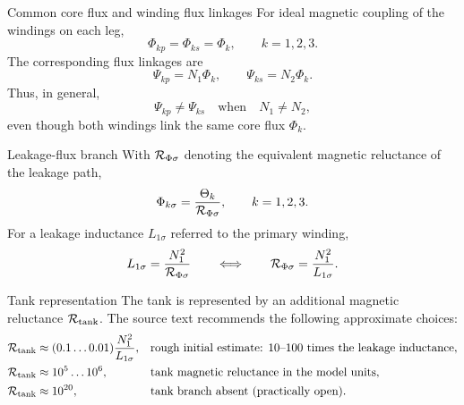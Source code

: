 	\newpage
	\thispagestyle{scrheadings}
	
	\begin{formulaBox}{Common core flux and winding flux linkages}
		For ideal magnetic coupling of the windings on each leg,
		\begin{equation}
			\Phi_{kp}=\Phi_{ks}=\Phi_k,
			\qquad k=1,2,3.
		\end{equation}
		The corresponding flux linkages are
		\begin{equation}
			\Psi_{kp}=N_1\Phi_k,
			\qquad
			\Psi_{ks}=N_2\Phi_k.
		\end{equation}
		Thus, in general,
		\begin{equation}
			\Psi_{kp}\ne\Psi_{ks}\quad\text{when}\quad N_1\ne N_2,
		\end{equation}
		even though both windings link the same core flux $\Phi_k$.
	\end{formulaBox}
	
	\begin{formulaBox}{Leakage-flux branch}
		With $\mathcal{R}_{\Phi\sigma}$ denoting the equivalent magnetic reluctance of the
		leakage path,
		\begin{equation}
			\Phi_{k\sigma}=\frac{\Theta_k}{\mathcal{R}_{\Phi\sigma}},
			\qquad k=1,2,3.
		\end{equation}
		For a leakage inductance $L_{1\sigma}$ referred to the primary winding,
		\begin{equation}
			L_{1\sigma}=\frac{N_1^2}{\mathcal{R}_{\Phi\sigma}}
			\qquad\Longleftrightarrow\qquad
			\mathcal{R}_{\Phi\sigma}=\frac{N_1^2}{L_{1\sigma}}.
		\end{equation}
	\end{formulaBox}
	
	\begin{formulaBox}{Tank representation}
		The tank is represented by an additional magnetic reluctance $\mathcal{R}_{\mathrm{tank}}$.
		The source text recommends the following approximate choices:
		\begin{align}
			\mathcal{R}_{\mathrm{tank}}
			&\approx (0.1\ldots0.01)\frac{N_1^2}{L_{1\sigma}},
			&&\text{rough initial estimate: 10–100 times the leakage inductance},\\
			\mathcal{R}_{\mathrm{tank}}
			&\approx 10^5\ldots10^6,
			&&\text{tank magnetic reluctance in the model units},\\
			\mathcal{R}_{\mathrm{tank}}
			&\approx 10^{20},
			&&\text{tank branch absent (practically open)}.
		\end{align}
	\end{formulaBox}
	
